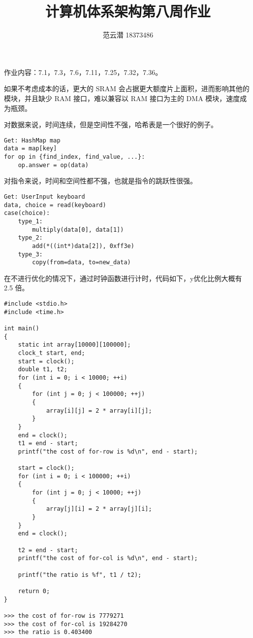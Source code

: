 \documentclass[lang=cn,11pt,a4paper,cite=authoryear]{elegantpaper}
\title{计算机体系架构\quad 第八周作业}
\author{范云潜 18373486}
\institute{微电子学院 184111 班}
\date{\zhtoday}
\begin{document}
\maketitle

作业内容：7.1，7.3，7.6，7.11，7.25，7.32，7.36。


如果不考虑成本的话，更大的 SRAM 会占据更大额度片上面积，进而影响其他的模块，并且缺少 RAM 接口，难以兼容以 RAM 接口为主的 DMA 模块，速度成为瓶颈。


对数据来说，时间连续，但是空间性不强，哈希表是一个很好的例子。

\begin{lstlisting}
Get: HashMap map
data = map[key]
for op in {find_index, find_value, ...}:
    op.answer = op(data)
\end{lstlisting}


对指令来说，时间和空间性都不强，也就是指令的跳跃性很强。

\begin{lstlisting}
Get: UserInput keyboard
data, choice = read(keyboard)
case(choice):
    type_1:
        multiply(data[0], data[1])
    type_2:
        add(*((int*)data[2]), 0xff3e)
    type_3:
        copy(from=data, to=new_data)
\end{lstlisting}



在不进行优化的情况下，通过时钟函数进行计时，代码如下，y优化比例大概有 2.5 倍。

\begin{lstlisting}
#include <stdio.h>
#include <time.h>

int main()
{
    static int array[10000][100000];
    clock_t start, end;
    start = clock();
    double t1, t2;
    for (int i = 0; i < 10000; ++i)
    {
        for (int j = 0; j < 100000; ++j)
        {
            array[i][j] = 2 * array[i][j];
        }
    }
    end = clock();
    t1 = end - start;
    printf("the cost of for-row is %d\n", end - start);

    start = clock();
    for (int i = 0; i < 100000; ++i)
    {
        for (int j = 0; j < 10000; ++j)
        {
            array[j][i] = 2 * array[j][i];
        }
    }
    end = clock();

    t2 = end - start;
    printf("the cost of for-col is %d\n", end - start);

    printf("the ratio is %f", t1 / t2);

    return 0;
}

>>> the cost of for-row is 7779271
>>> the cost of for-col is 19284270
>>> the ratio is 0.403400                
\end{lstlisting}
\end{document}

